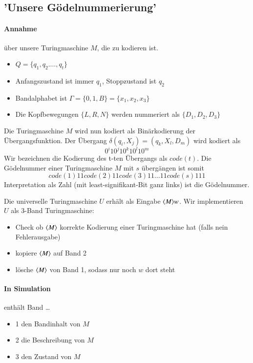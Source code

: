 \subsection{'Unsere Gödelnummerierung'}

\paragraph*{Annahme} über unsere Turingmaschine $M$, die zu kodieren ist.
\begin{itemize}
	\item $Q=\{q_1,q_2.\dots,q_t\}$
	\item Anfangszustand ist immer $q_1$, Stoppzustand ist $q_2$
	\item Bandalphabet ist $\Gamma=\{0,1,B\}=\{x_1,x_2,x_3\}$
	\item Die Kopfbewegungen $\{L,R,N\}$ werden nummeriert als $\{D_1,D_2,D_3\}$
\end{itemize}
Die Turingmaschine $M$ wird nun kodiert als Binärkodierung der Übergangsfunktion. Der Übergang $\delta(q_i,X_j)=(q_k,X_l,D_m)$ wird kodiert als $$0^i10^j10^k10^l10^m$$ Wir bezeichnen die Kodierung des t-ten Übergangs als $code(t)$. Die Gödelnummer einer Turingmaschine $M$ mit $s$ übergängen ist somit $$code(1)11code(2)11code(3)11 \dots 11code(s)111$$ 
Interpretation als Zahl (mit least-signifikant-Bit ganz links) ist die Gödelnummer.

\par\medskip
Die universelle Turingmaschine $U$ erhält als Eingabe $\langle M \rangle w$. Wir implementieren $U$ als 3-Band Turingmaschine:
\begin{itemize}
	\item Check ob $\langle M \rangle$ korrekte Kodierung einer Turingmaschine hat (falls nein Fehlerausgabe)
	\item kopiere $\langle M \rangle$ auf Band 2
	\item lösche $\langle M \rangle$ von Band 1, sodass nur noch $w$ dort steht
\end{itemize}

\paragraph*{In Simulation} enthält Band \dots
\begin{itemize}
	\item 1 den Bandinhalt von $M$
	\item 2 die Beschreibung von $M$
	\item 3 den Zustand von $M$
\end{itemize}

